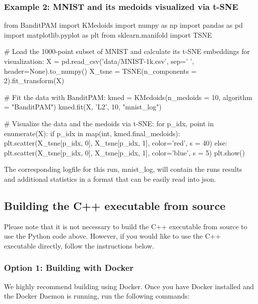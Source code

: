 \subsubsection*{Example 2\+: M\+N\+I\+ST and its medoids visualized via t-\/\+S\+NE}


\begin{DoxyCode}
from BanditPAM import KMedoids
import numpy as np
import pandas as pd
import matplotlib.pyplot as plt
from sklearn.manifold import TSNE

# Load the 1000-point subset of MNIST and calculate its t-SNE embeddings for visualization:
X = pd.read\_csv('data/MNIST-1k.csv', sep=' ', header=None).to\_numpy()
X\_tsne = TSNE(n\_components = 2).fit\_transform(X)

# Fit the data with BanditPAM:
kmed = KMedoids(n\_medoids = 10, algorithm = "BanditPAM")
kmed.fit(X, 'L2', 10, "mnist\_log")

# Visualize the data and the medoids via t-SNE:
for p\_idx, point in enumerate(X):
    if p\_idx in map(int, kmed.final\_medoids):
        plt.scatter(X\_tsne[p\_idx, 0], X\_tsne[p\_idx, 1], color='red', s = 40)
    else:
        plt.scatter(X\_tsne[p\_idx, 0], X\_tsne[p\_idx, 1], color='blue', s = 5)
plt.show()
\end{DoxyCode}
 The corresponding logfile for this run, {\ttfamily mnist\+\_\+log}, will contain the run\textquotesingle{}s results and additional statistics in a format that can be easily read into json.

\subsection*{Building the C++ executable from source}

Please note that it is not necessary to build the C++ executable from source to use the Python code above. However, if you would like to use the C++ executable directly, follow the instructions below.

\subsubsection*{Option 1\+: Building with Docker}

We highly recommend building using Docker. Once you have Docker installed and the Docker Daemon is running, run the following commands\+:




